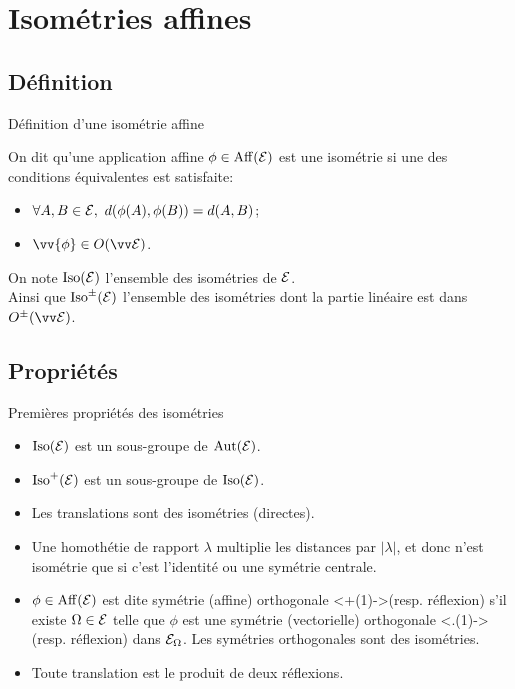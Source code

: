 \documentclass{m53beamer}
\begin{document}
\section{Isométries affines}

\subsection{Définition}
\begin{frame}{Définition d'une isométrie affine}
  \begin{defprop}
    On dit qu'une application affine $\phi \in\operatorname{Aff}(\mathcal{E})$ est une \alert{isométrie} si une des conditions équivalentes est satisfaite:
    \begin{itemize}[<+(1)->]
      \item $\forall A,B \in \ens{E},\ d(\phi(A),\phi(B)) = d(A,B)$;
      \item $\vv{\phi} \in O(\ev{E})$.
    \end{itemize}
  \end{defprop}\pause
  On note \alert{$\operatorname{Iso}(\mathcal{E})$} l'ensemble des isométries de $\mathcal{E}$.\pause\\
  Ainsi que \alert{$\operatorname{Iso}^{\pm}(\mathcal{E})$} l'ensemble des isométries dont la partie linéaire est dans $O^{\pm}(\ev{E})$.
\end{frame}

\subsection{Propriétés}
\begin{frame}{Premières propriétés des isométries}
  \begin{itemize}[<+(1)->]
    \item $\operatorname{Iso}(\mathcal{E})$ est un sous-groupe de $\operatorname{Aut}(\mathcal{E})$.
    \item $\operatorname{Iso}^{+}(\mathcal{E})$ est un sous-groupe de $\operatorname{Iso}(\mathcal{E})$.
    \item Les translations sont des isométries (directes).
    \item Une homothétie de rapport $\lambda$ multiplie les distances par $|\lambda|$\pause ,
      et donc n'est isométrie que si c'est l'identité ou une symétrie centrale.
    \item $\phi \in\operatorname{Aff}(\mathcal{E})$ est dite \alert{symétrie (affine) orthogonale} \uncover<+(1)->{(resp. \alert{réflexion})} s'il existe $\Omega \in \mathcal{E}$ telle que $\phi$ est une symétrie (vectorielle) orthogonale \uncover<.(1)->{(resp. réflexion)} dans $\mathcal{E}_{\Omega}$. \pause Les symétries orthogonales sont des isométries.
    \item Toute translation est le produit de deux réflexions.
  \end{itemize}
\end{frame}
\end{document}
